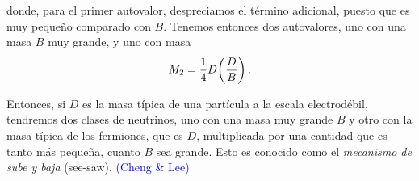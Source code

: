 \noindent donde, para el primer autovalor, despreciamos el término adicional, puesto que es muy pequeño comparado con $B$. Tenemos entonces dos autovalores, uno con una masa $B$ muy grande, y uno con masa 
%
\begin{equation}
	M_2 = \frac{1}{4} D\qty(\frac{D}{B}) \,.
\end{equation}

Entonces, si $D$ es la masa típica de una partícula a la escala electrodébil, tendremos dos clases de neutrinos, uno con una masa muy grande $B$ y otro con la masa típica de los fermiones, que es $D$, multiplicada por una cantidad que es tanto más pequeña, cuanto $B$ sea grande. Esto es conocido como el \emph{mecanismo de sube y baja} (see-saw). \textcolor{blue}{(Cheng \& Lee)}